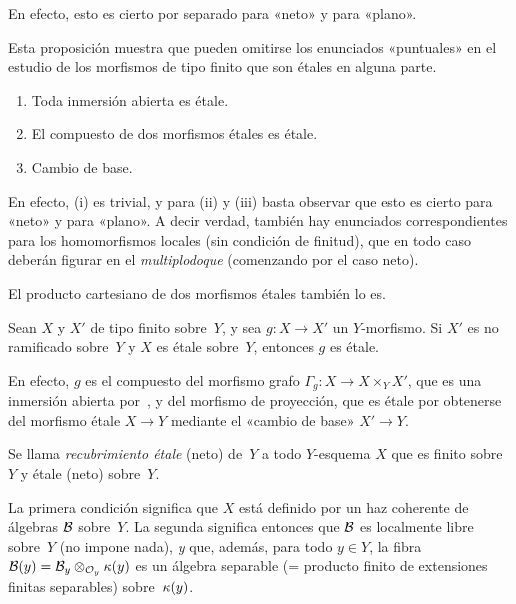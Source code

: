 En efecto, esto es cierto por separado para «neto» y para «plano».

Esta proposición muestra que pueden omitirse los enunciados «puntuales» en el estudio de los morfismos de tipo finito que son étales en alguna parte.
\begin{proposition}
\label{I.4.6}
\begin{enumerate}
\item[(i)] Toda inmersión abierta es étale.
\item[(ii)] El compuesto de dos morfismos étales es étale.
\item[(iii)] Cambio de base.
\end{enumerate}
\end{proposition}

En efecto, (i) es trivial, y para (ii) y (iii) basta observar que esto es cierto para «neto» y para «plano». A decir verdad, también hay enunciados correspondientes para los homomorfismos locales (sin condición de finitud), que en todo caso deberán figurar en el \emph{multiplodoque} (comenzando por el caso neto).

\begin{corollaire}
\label{I.4.7}
El producto cartesiano de dos morfismos étales también lo es.
\end{corollaire}

\begin{corollaire}
\label{I.4.8}
Sean $X$ y $X'$ de tipo finito sobre~$Y$, y sea $g\colon X\to X'$ un $Y$-morfismo. Si $X'$ es no ramificado sobre~$Y$ y $X$ es étale sobre~$Y$, entonces $g$ es étale.
\end{corollaire}

En efecto, $g$ es el compuesto del morfismo grafo $\Gamma_g\colon X\to X\times_Y X'$, que es una inmersión abierta por~, y del morfismo de proyección, que es étale por obtenerse del morfismo étale $X\to Y$ mediante el «cambio de base» $X'\to Y$.

\begin{definition}
\label{I.4.9}
Se llama \emph{recubrimiento étale} (\resp neto)
%
%
%
de~$Y$ a todo $Y$-esquema $X$ que es finito sobre~$Y$ y étale (\resp neto) sobre~$Y$.
\end{definition}

{\enlargethispage{.5cm}}%
La primera condición significa que $X$ está definido por un haz coherente de álgebras $\cal{B}$ sobre~$Y$. La segunda significa entonces que $\cal{B}$ es localmente libre sobre~$Y$ (\resp no impone nada), \emph{y} que, además, para todo $y\in Y$, la fibra $\cal{B}(y)=\cal{B}_y\otimes_{\cal{O}_y}\kres(y)$ es un álgebra separable (= producto finito de extensiones finitas separables) sobre~$\kres(y)$.

